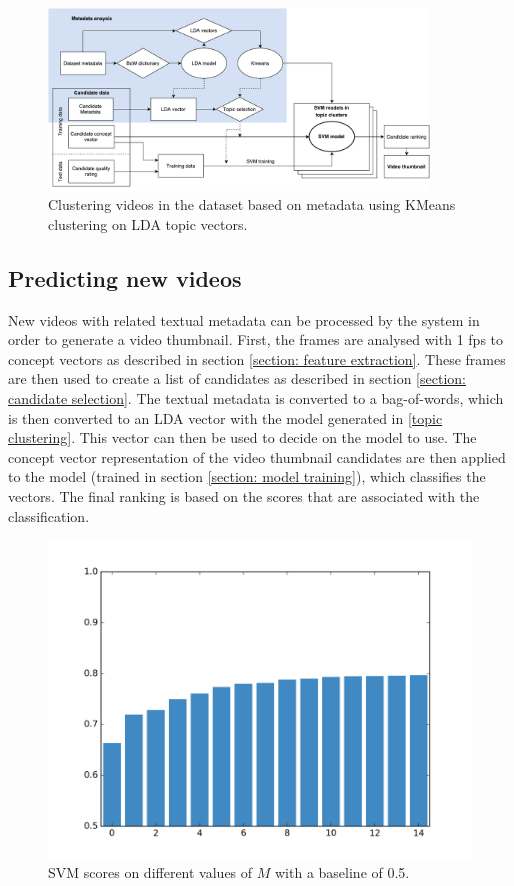 \documentclass{../resources/sig-alternate-05-2015}
\begin{document}
\begin{figure}[tb!]
	\centering
	\includegraphics[width=0.9\textwidth]{resources/topic-clustering}
	\caption{Clustering videos in the dataset based on metadata using KMeans clustering on LDA topic vectors.}
	\label{figure: topic clustering scheme}
\end{figure}

\subsection{Predicting new videos}

New videos with related textual metadata can be processed by the system in order to generate a video thumbnail. First, the frames are analysed with 1 fps to concept vectors as described in section \ref{section: feature extraction}. These frames are then used to create a list of candidates as described in section \ref{section: candidate selection}. The textual metadata is converted to a bag-of-words, which is then converted to an LDA vector with the model generated in \ref{topic clustering}. This vector can then be used to decide on the model to use. The concept vector representation of the video thumbnail candidates are then applied to the model (trained in section \ref{section: model training}), which classifies the vectors. The final ranking is based on the scores that are associated with the classification.


\begin{figure}[h]
	\centering
	\includegraphics[width=\linewidth]{resources/svm-accuracy}
	\caption{SVM scores on different values of $M$ with a baseline of 0.5.}
	\label{figure: svm accuracy with k}
\end{figure}
\end{document}
